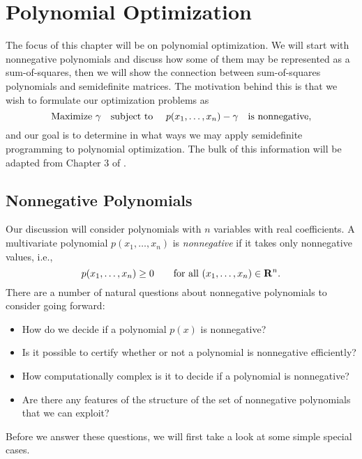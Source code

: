 
	\chapter{Polynomial Optimization}		%
	\label{PolyOpchap}		%
	
	 The focus of this chapter will be on polynomial optimization. We will start with nonnegative polynomials and discuss how some of them may be represented as a sum-of-squares, then we will show the connection between sum-of-squares polynomials and semidefinite matrices. The motivation behind this is that we wish to formulate our optimization problems as
	 $$
	 \textnormal{Maximize } \gamma \quad \textnormal{subject to } \quad p(x_1, \dots, x_n) - \gamma \quad \textnormal{is nonnegative},
	 $$
	 and our goal is to determine in what ways we may apply semidefinite programming to polynomial optimization. The bulk of this information will be adapted from Chapter 3 of \cite{BlekhermanGrigoriy;ParriloPabloA.;Thomas2013}.
	 
	 \section{Nonnegative Polynomials}
	 
	Our discussion will consider polynomials with $n$ variables with real coefficients. A multivariate polynomial $p(x_1, \dots, x_n)$ is \emph{nonnegative} if it takes only nonnegative values, i.e., 
	\begin{equation}
		p(x_1, \dots, x_n) \geq 0 \qquad \textnormal{for all } (x_1, \dots, x_n) \in \mathbf{R}^n.
	\end{equation}
	There are a number of natural questions about nonnegative polynomials to consider going forward:
	\begin{itemize}
		\item How do we decide if a polynomial $p(x)$ is nonnegative?
		
		\item Is it possible to certify whether or not a polynomial is nonnegative efficiently?
		
		\item How computationally complex is it to decide if a polynomial is nonnegative?
		
		\item Are there any features of the structure of the set of nonnegative polynomials that we can exploit?
	\end{itemize}
	Before we answer these questions, we will first take a look at some simple special cases.
	
